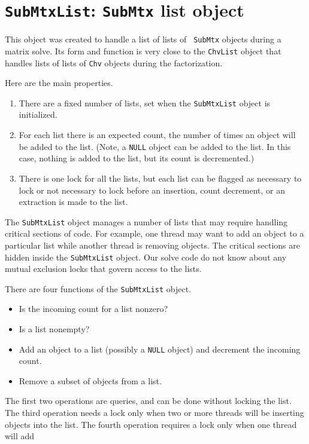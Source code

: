 \par
\chapter{{\tt SubMtxList}: {\tt SubMtx} list object }
\par
This object was created to handle a list of lists of {\tt
SubMtx} objects during a matrix solve.
Its form and function is very close to the {\tt ChvList} object
that handles lists of lists of {\tt Chv} objects during the
factorization.
\par
Here are the main properties.
\begin{enumerate}
\item
There are a fixed number of lists, set when the {\tt SubMtxList}
object is initialized.
\item
For each list there is an expected count, the number of times an
object will be added to the list. (Note, a {\tt NULL} object can be
added to the list. In this case, nothing is added to the list,
but its count is decremented.)
\item
There is one lock for all the lists, but each list can be flagged
as necessary to lock or not necessary to lock before an insertion, 
count decrement, or an extraction is made to the list.
\end{enumerate}
\par
The {\tt SubMtxList} object manages a number of lists 
that may require handling critical sections of code.
For example, one thread may want to add an object to a particular
list while another thread is removing objects.
The critical sections are hidden inside the {\tt SubMtxList} object.
Our solve code do not know about any mutual exclusion
locks that govern access to the lists.
\par
There are four functions of the {\tt SubMtxList} object.
\begin{itemize}
\item
Is the incoming count for a list nonzero?
\item
Is a list nonempty?
\item
Add an object to a list (possibly a {\tt NULL} object) and
decrement the incoming count.
\item
Remove a subset of objects from a list.
\end{itemize}
The first two operations are queries, and can be done without
locking the list.
The third operation needs a lock only when two or more threads will
be inserting objects into the list.
The fourth operation requires a lock only when one thread will add
